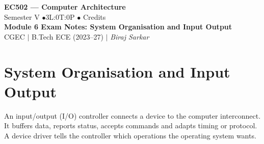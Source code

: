 \documentclass[12pt,a4paper]{article}
\begin{document}

\begin{center}
  {\LARGE\bfseries\color{myred} EC502 --- Computer Architecture}\\[5pt]
  {\normalsize\color{mydark} Semester V \quad$\bullet$\quad 3L:0T:0P \quad$\bullet$ Credits}\\[3pt]
  {\normalsize\color{myteal}\textbf{Module 6 Exam Notes: System Organisation and Input Output}}\\[3pt]
  {\small\color{mydark} CGEC \;$|$\; B.Tech ECE (2023--27) \;$|$\; \textit{Biraj Sarkar}}
\end{center}
\vspace{2pt}
\noindent{\color{myred}\rule{\linewidth}{1.5pt}}
\vspace{2pt}

\hypersetup{linkcolor=mydark}
\tableofcontents
\hypersetup{linkcolor=myteal}
\newpage

\section{System Organisation and Input Output}
\begin{tcolorbox}[defbox,title={I/O interface and controller}]
An input/output (I/O) controller connects a device to the computer interconnect. It buffers data, reports status, accepts commands and adapts timing or protocol. A device driver tells the controller which operations the operating system wants.
\end{tcolorbox}
\end{document}
